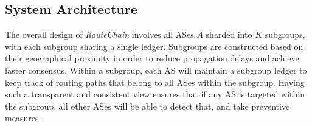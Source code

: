 \documentclass[5p]{elsarticle}
\newcommand{\rc}{{{\em RouteChain}}\xspace}
\begin{document}
{\def\arraystretch{1}
\begin{table}\caption{Symbols and Definition}
\centering
{}
\label{tab:one}
\end{table} } 

\subsection{System Architecture}\label{sec:do}
The overall design of \rc involves all ASes $A$ sharded into $K$ subgroups, with each subgroup sharing a single ledger. Subgroups are constructed based on their geographical proximity in order to reduce propagation delays and achieve faster consensus. Within a subgroup, each AS will maintain a subgroup ledger to keep track of routing paths that belong to all ASes within the subgroup. Having such a transparent and consistent view ensures that if any AS is targeted within the subgroup, all other ASes will be able to detect that, and take preventive measures. 
\end{document}

